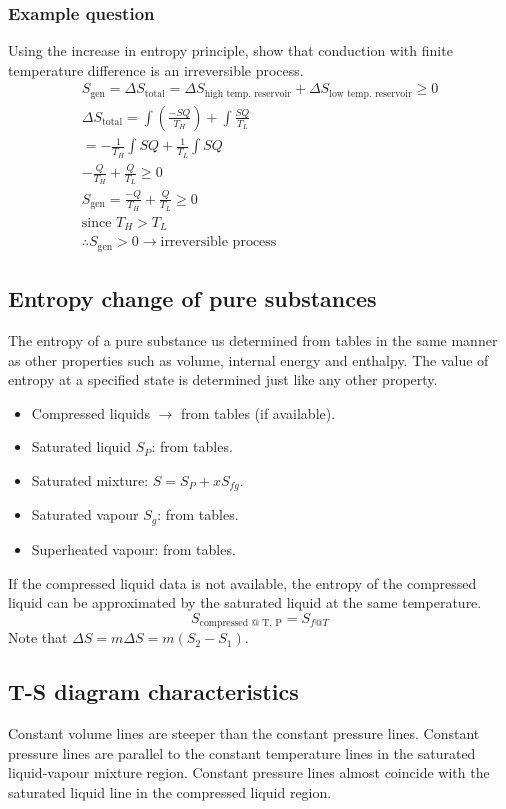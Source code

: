 \documentclass[class=report, crop=false, 12pt,a4paper]{standalone}
\numberwithin{equation}{section}
\begin{document}
\subsubsection{Example question}
Using the increase in entropy principle, show that conduction with finite temperature difference is an irreversible process.
\begin{gather}
  S_{\textrm{gen}} = \Delta S_{\textrm{total}} = \Delta S_{\textrm{high temp. reservoir}} + \Delta S_{\textrm{low temp. reservoir}} \geq 0\\
  \Delta S_{\textrm{total}} = \int \left( \frac{-SQ}{T_H} \right) + \int \frac{SQ}{T_L} \\
  = -\frac{1}{T_H} \int SQ + \frac{1}{T_L} \int SQ \\
  -\frac{Q}{T_H} + \frac{Q}{T_L} \geq 0 \\
  S_{\textrm{gen}} = \frac{-Q}{T_H} + \frac{Q}{T_L} \geq 0 \\
  \textrm{since } T_H > T_L \\
  \therefore S_{\textrm{gen}} > 0 \rightarrow \textrm{irreversible process}
\end{gather}
\subsection{Entropy change of pure substances}
The entropy of a pure substance us determined from tables in the same manner as other properties such as volume, internal energy and enthalpy. The value of entropy at a specified state is determined just like any other property.
\begin{itemize}[noitemsep]
  \item Compressed liquids \(\rightarrow\) from tables (if available).
  \item Saturated liquid \(S_P\): from tables.
  \item Saturated mixture: \(S=S_P + xS_{fg}\).
  \item Saturated vapour \(S_g\): from tables.
  \item Superheated vapour: from tables.
\end{itemize}
If the compressed liquid data is not available, the entropy of the compressed liquid can be approximated by the saturated liquid at the same temperature.
\begin{equation} 
  S_{\textrm{compressed @ T, P}} = S_{f@T} 
\end{equation}
Note that \( \Delta S = m \Delta S = m(S_2 - S_1)\).
\subsection{T-S diagram characteristics}
Constant volume lines are steeper than the constant pressure lines. Constant pressure lines are parallel to the constant temperature lines in the saturated liquid-vapour mixture region. Constant pressure lines almost coincide with the saturated liquid line in the compressed liquid region. 
\end{document}

